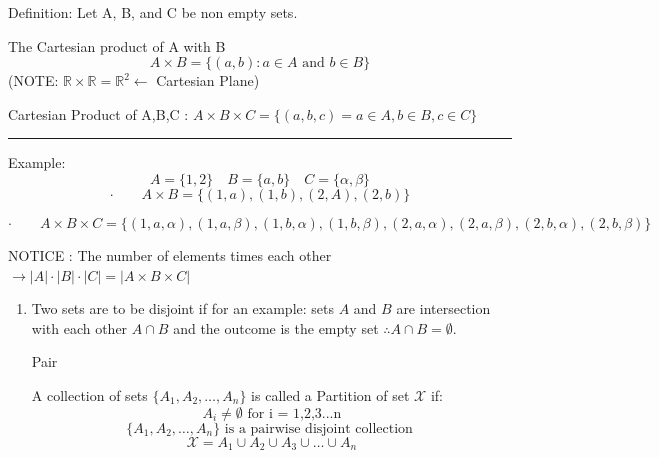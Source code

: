\documentclass[10pt,letterpaper]{article}
\begin{document}
{\begin{enumerate}
\begin{center}
        \end{center}
        
    \end{enumerate}
    
    Definition: Let A, B, and C be non empty sets.
    
    The Cartesian product of A with B 
    $$ A \times B = \{ (a,b) : a \in A \text{ and } b \in B\}$$ 
    \quad (NOTE: $\mathbb{R} \times \mathbb{R} = \mathbb{R}^{2} \leftarrow$ Cartesian Plane)
    
    Cartesian Product of A,B,C : $A \times B \times C = \{ (a,b,c) = a \in A, b \in B, c \in C \}$
    \vspace{.4em}
    \hrule
    \vspace{.4em}

    Example:
    $$ A = \{ 1,2\} \quad B = \{a,b\} \quad C = \{\alpha,\beta\} $$
    $$ \cdot  \qquad A \times B = \{(1,a), (1,b), (2,A), (2,b)\}$$
        
    $$ \cdot  \qquad A \times B \times C = \{(1,a,\alpha), (1,a,\beta), (1,b,\alpha), (1,b,\beta), (2,a,\alpha), (2,a,\beta),(2,b,\alpha), (2,b,\beta) \}$$
    
    NOTICE : The number of elements times each  other $\rightarrow |A| \cdot |B| \cdot |C| = |A\times B\times C|$
    
    \newpage
    \begin{enumerate}
        \item [] 
        Two sets are to be disjoint if for an example: sets $A$ and $B$ are intersection with each other $A \cap B$ and the outcome is the empty set $\therefore A \cap B = \emptyset$.
        
        Pair
        
        A collection of sets $\{A_{1},A_{2},\ldots,A_{n} \} $ is called a Partition of set $\mathcal{X}$
        if:
        $$ A_{i} \not = \emptyset \text{ for i = 1,2,3...n}$$ 
        $$ \{A_{1},A_{2},\ldots,A_{n}\} \text{ is a pairwise disjoint collection }$$
        $$ \mathcal{X} = A_{1} \cup A_{2} \cup A_{3} \cup \ldots \cup A_{n} $$
        
        
    \end{enumerate}{}
}
\end{document}
